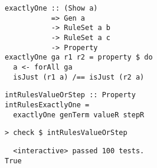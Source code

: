 \begin{frame}[fragile]
  \begin{verbatim}
exactlyOne :: (Show a)
           => Gen a
           -> RuleSet a b
           -> RuleSet a c
           -> Property
exactlyOne ga r1 r2 = property $ do
  a <- forAll ga
  isJust (r1 a) /== isJust (r2 a)
  \end{verbatim}
\end{frame}

\begin{frame}[fragile]
  \begin{verbatim}
intRulesValueOrStep :: Property
intRulesExactlyOne =
  exactlyOne genTerm valueR stepR
  \end{verbatim}
\end{frame}

\begin{frame}[fragile]
  \begin{verbatim}
> check $ intRulesValueOrStep
  \end{verbatim}
  \begin{verbatim}
  <interactive> passed 100 tests.
True
  \end{verbatim}
\end{frame}

